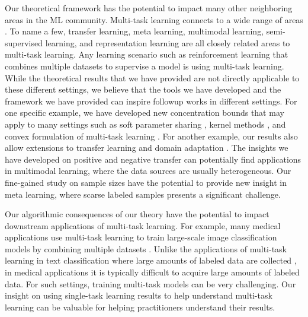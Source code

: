 Our theoretical framework has the potential to impact many other neighboring areas in the ML community.
Multi-task learning connects to a wide range of areas \cite{V20}.
To name a few, transfer learning, meta learning, multimodal learning, semi-supervised learning, and representation learning are all closely related areas to multi-task learning.
Any learning scenario such as reinforcement learning \cite{YKGLHF20} that combines multiple datasets to supervise a model is using multi-task learning.
While the theoretical results that we have provided are not directly applicable to these different settings, we believe that the tools we have developed and the framework we have provided can inspire followup works in different settings.
For one specific example, we have developed new concentration bounds that may apply to many settings such as soft parameter sharing \cite{R17} , kernel methods \cite{EMP05}, and convex formulation of multi-task learning \cite{ZY14}.
For another example, our results also allow extensions to transfer learning and domain adaptation \cite{K18}.
The insights we have developed on positive and negative transfer can potentially find applications in multimodal learning, where the data sources are usually heterogeneous.
Our fine-gained study on sample sizes have the potential to provide new insight in meta learning, where scarse labeled samples presents a significant challenge.

Our algorithmic consequences of our theory have the potential to impact downstream applications of multi-task learning.
For example, many medical applications use multi-task learning to train large-scale image classification models by combining multiple datasets \cite{chexnet17,EA20}.
Unlike the applications of multi-task learning in text classification where large amounts of labeled data are collected \cite{GLUE}, in medical applications it is typically difficult to acquire large amounts of labeled data.
For such settings, training multi-task models can be very challenging.
Our insight on using single-task learning results to help understand multi-task learning can be valuable for helping practitioners understand their results.
